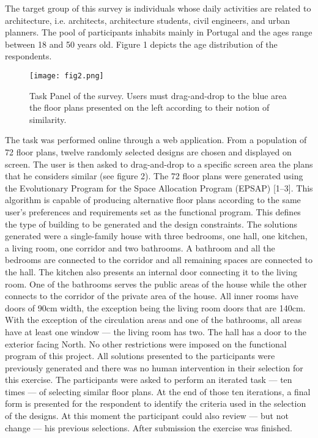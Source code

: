 \documentclass[]{scrartcl}
\begin{document}
The target group of this survey is individuals whose daily activities are related to architecture, i.e. architects, architecture students, civil engineers, and urban planners. The pool of participants inhabits mainly in Portugal and the ages range between 18 and 50 years old. Figure 1 depicts the age distribution of the respondents.

 \begin{figure}[htbp]
\centering
\texttt{[image: fig2.png]}
\caption{Task Panel of the survey. Users must drag-and-drop to the blue area the floor plans presented on the left according to their notion of similarity.}
\label{fig1}
\end{figure}

The task was performed online through a web application. From a population of 72 floor plans, twelve randomly selected designs are chosen and displayed on screen. The user is then asked to drag-and-drop to a specific screen area the plans that he considers similar (see figure 2).
The 72 floor plans were generated using the Evolutionary Program for the Space Allocation Program (EPSAP) [1–3]. This algorithm is capable of producing alternative floor plans according to the same user’s preferences and requirements set as the functional program. This defines the type of building to be generated and the design constraints. The solutions generated were a single-family house with three bedrooms, one hall, one kitchen, a living room, one corridor and two bathrooms. A bathroom and all the bedrooms are connected to the corridor and all remaining spaces are connected to the hall. The kitchen also presents an internal door connecting it to the living room. One of the bathrooms serves the public areas of the house while the other connects to the corridor of the private area of the house. All inner rooms have doors of 90cm width, the exception being the living room doors that are 140cm. With the exception of the circulation areas and one of the bathrooms, all areas have at least one window — the living room has two. The hall has a door to the exterior facing North. No other restrictions were imposed on the functional program of this project. All solutions presented to the participants were previously generated and there was no human intervention in their selection for this exercise.
The participants were asked to perform an iterated task — ten times — of selecting similar floor plans. At the end of those ten iterations, a final form is presented for the respondent to identify the criteria used in the selection of the designs. At this moment the participant could also review — but not change — his previous selections. After submission the exercise was finished.
\end{document}

